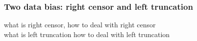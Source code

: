 \documentclass[12pt,letterpaper]{article}
\begin{document}
\subsubsection{Two data bias: right censor and left truncation}
 what is right censor, how to deal with right censor\\
 what is left truncation how to deal with left truncation\\
%    
\end{document}
